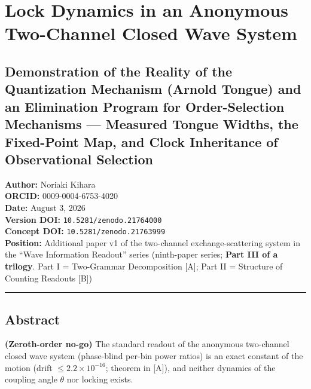 \documentclass[
  a4paper,
]{article}
\author{}
\date{}
\begin{document}
\section{Lock Dynamics in an Anonymous Two-Channel Closed Wave
System}\label{lock-dynamics-in-an-anonymous-two-channel-closed-wave-system}

\subsection{Demonstration of the Reality of the Quantization Mechanism
(Arnold Tongue) and an Elimination Program for Order-Selection
Mechanisms --- Measured Tongue Widths, the Fixed-Point Map, and Clock
Inheritance of Observational
Selection}\label{demonstration-of-the-reality-of-the-quantization-mechanism-arnold-tongue-and-an-elimination-program-for-order-selection-mechanisms-measured-tongue-widths-the-fixed-point-map-and-clock-inheritance-of-observational-selection}

\textbf{Author:} Noriaki Kihara\\
\textbf{ORCID:} 0009-0004-6753-4020\\
\textbf{Date:} August 3, 2026\\
\textbf{Version DOI:} \texttt{10.5281/zenodo.21764000}\\
\textbf{Concept DOI:} \texttt{10.5281/zenodo.21763999}\\
\textbf{Position:} Additional paper v1 of the two-channel
exchange-scattering system in the ``Wave Information Readout'' series
(ninth-paper series; \textbf{Part III of a trilogy}. Part I =
Two-Grammar Decomposition {[}A{]}; Part II = Structure of Counting
Readouts {[}B{]})

\begin{center}\rule{0.5\linewidth}{0.5pt}\end{center}

\subsection{Abstract}\label{abstract}

\textbf{(Zeroth-order no-go)} The standard readout of the anonymous
two-channel closed wave system (phase-blind per-bin power ratios) is an
exact constant of the motion (drift \(\le2.2\times10^{-16}\); theorem in
{[}A{]}), and neither dynamics of the coupling angle \(\theta\) nor
locking exists.
\end{document}
